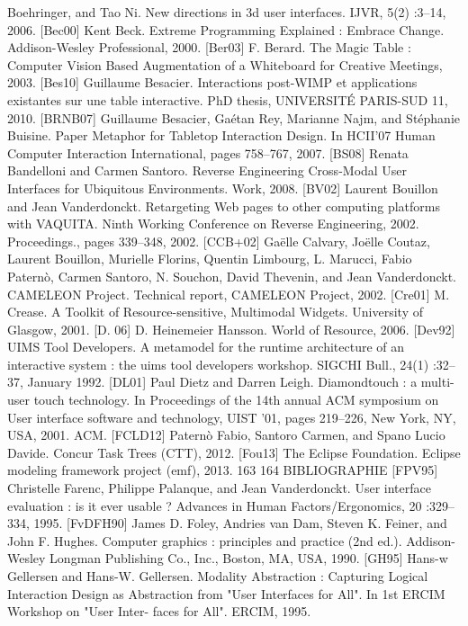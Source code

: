 \documentclass{article}
\begin{document}
Boehringer, and Tao Ni. New directions in 3d user interfaces. IJVR, 5(2) :3–14, 2006.
[Bec00]
Kent Beck. Extreme Programming Explained : Embrace Change. Addison-Wesley
Professional, 2000.
[Ber03]
F. Berard. The Magic Table : Computer Vision Based Augmentation of a Whiteboard
for Creative Meetings, 2003.
[Bes10]
Guillaume Besacier. Interactions post-WIMP et applications existantes sur une table
interactive. PhD thesis, UNIVERSITÉ PARIS-SUD 11, 2010.
[BRNB07]
Guillaume Besacier, Ga\'{e}tan Rey, Marianne Najm, and St\'{e}phanie Buisine. Paper Metaphor for Tabletop Interaction Design. In HCII’07 Human Computer Interaction International, pages 758–767, 2007.
[BS08]
Renata Bandelloni and Carmen Santoro. Reverse Engineering Cross-Modal User Interfaces for Ubiquitous Environments. Work, 2008.
[BV02]
Laurent Bouillon and Jean Vanderdonckt. Retargeting Web pages to other computing
platforms with VAQUITA. Ninth Working Conference on Reverse Engineering, 2002.
Proceedings., pages 339–348, 2002.
[CCB+02]
Ga\"{e}lle Calvary, Jo\"{e}lle Coutaz, Laurent Bouillon, Murielle Florins, Quentin Limbourg,
L. Marucci, Fabio Paternò, Carmen Santoro, N. Souchon, David Thevenin, and Jean
Vanderdonckt. CAMELEON Project. Technical report, CAMELEON Project, 2002.
[Cre01]
M. Crease. A Toolkit of Resource-sensitive, Multimodal Widgets. University of Glasgow, 2001.
[D. 06]
D. Heinemeier Hansson. World of Resource, 2006.
[Dev92]
UIMS Tool Developers. A metamodel for the runtime architecture of an interactive
system : the uims tool developers workshop. SIGCHI Bull., 24(1) :32–37, January
1992.
[DL01]
Paul Dietz and Darren Leigh. Diamondtouch : a multi-user touch technology. In Proceedings of the 14th annual ACM symposium on User interface software and technology, UIST ’01, pages 219–226, New York, NY, USA, 2001. ACM.
[FCLD12]
Paternò Fabio, Santoro Carmen, and Spano Lucio Davide. Concur Task Trees (CTT),
2012.
[Fou13]
The Eclipse Foundation. Eclipse modeling framework project (emf), 2013.
163
164
BIBLIOGRAPHIE
[FPV95]
Christelle Farenc, Philippe Palanque, and Jean Vanderdonckt. User interface evaluation : is it ever usable ? Advances in Human Factors/Ergonomics, 20 :329–334, 1995.
[FvDFH90]
James D. Foley, Andries van Dam, Steven K. Feiner, and John F. Hughes. Computer
graphics : principles and practice (2nd ed.). Addison-Wesley Longman Publishing
Co., Inc., Boston, MA, USA, 1990.
[GH95]
Hans-w Gellersen and Hans-W. Gellersen. Modality Abstraction : Capturing Logical
Interaction Design as Abstraction from "User Interfaces for All". In 1st ERCIM Workshop on "User Inter- faces for All". ERCIM, 1995.
\end{document}
